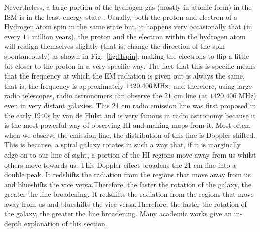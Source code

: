 
Nevertheless, a large portion of the hydrogen gas (mostly in atomic form) in the ISM is in the least energy state \citep{klessen2016physical}. 
Usually, both the proton and electron of a Hydrogen atom spin in the same state but, it happens very occasionally that (in every $11$ million years), 
the proton and the electron within the hydrogen atom 
will realign themselves slightly (that is, change the direction of the spin spontaneously) as shown in Fig.~\ref{fig:Hspin}, 
making the electrons to flip a little bit closer to the proton in a very specific way.
The fact that this is specific means that the frequency at which the EM radiation is given out is always the same, 
that is, the frequency is approximately $1420.406 \, \rm{MHz}$, and therefore, using large radio telescopes, radio
astronomers can observe the $21$ cm line (at  $1420.406$ MHz) even in very distant galaxies.
This 21 cm radio emission line was first proposed in the early 1940s by van de Hulst and is very famous in radio astronomy because 
it is the most powerful way of observing HI and making maps from it. 
Most often, when we observe the emission line, the distribution of this line  is Doppler shifted. This is because, a spiral galaxy rotates
in such a way that, if it is marginally edge-on to our line of sight, a portion of the HI regions
move away from us whilst others move towards us. This Doppler effect broadens the 21 cm
line into a double peak. It redshifts the radiation from the regions that move away from us
and blueshifts the vice versa.Therefore, the faster the rotation of the galaxy, the greater the
line broadening. It redshifts the radiation from the regions that move away from us
and blueshifts the vice versa.Therefore, the faster the rotation of the galaxy, the greater the
line broadening. Many academic works \citep{condon2016essential,wilson2013tools,wilson2009tools} give an in-depth explanation of this section.
